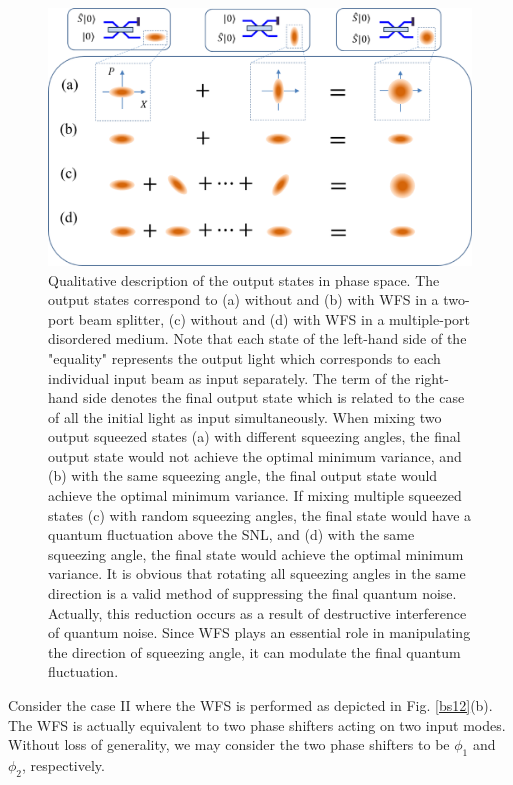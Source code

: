 \documentclass[9pt,twocolumn,twoside]{osajnl}
\begin{document}
\begin{figure}[htb]
\begin{center}
\includegraphics[width=.75\textwidth]{01_20190612_illustration.eps} {}
\end{center}
\caption{Qualitative description of the output states in phase space. The output states correspond to (a) without and (b) with WFS in a two-port beam splitter, (c) without and (d) with WFS in a multiple-port disordered medium. Note that each state of the left-hand side of the "equality" represents the output light which corresponds to each individual input beam as input separately. The term of the right-hand side denotes the final output state which is related to the case of all the initial light as input simultaneously. When mixing two output squeezed states (a) with different squeezing angles, the final output state would not achieve the optimal minimum variance, and (b) with the same squeezing angle, the final output state would achieve the optimal minimum variance. If mixing multiple squeezed states (c) with random squeezing angles, the final state would have a quantum fluctuation above the SNL, and (d) with the same squeezing angle, the final state would achieve the optimal minimum variance. It is obvious that rotating all squeezing angles in the same direction is a valid method of suppressing the final quantum noise. Actually, this reduction occurs as a result of destructive interference of quantum noise. Since WFS plays an essential role in manipulating the direction of squeezing angle, it can modulate the final quantum fluctuation. }
\label{illustration}
\end{figure}

Consider the case II where the WFS is performed as depicted in Fig. \ref{bs12}(b). The WFS is actually equivalent to two phase shifters acting on two input modes. Without loss of generality, we may consider the two phase shifters to be $\phi_1$ and $\phi_2$, respectively. 
\end{document}
